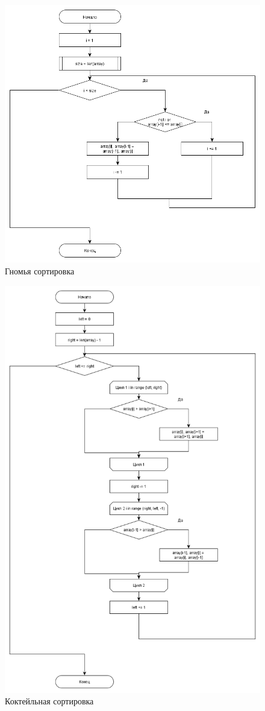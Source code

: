 \documentclass[a4paper,12pt]{report}
\begin{document}
        \begin{figure}[h!]
        	\centering
        	\includegraphics[width=0.8\linewidth]{gnome_sort1.png}
        	\caption{Гномья сортировка}
        	\label{ris:gnome}
        \end{figure}
        
        \newpage
        
        \begin{figure}[h!]
        	\centering
        	\includegraphics[width=0.8\linewidth]{cocktail_sort1.png}
        	\caption{Коктейльная сортировка}
        	\label{ris:cockteil}
        \end{figure}
    
\end{document}
